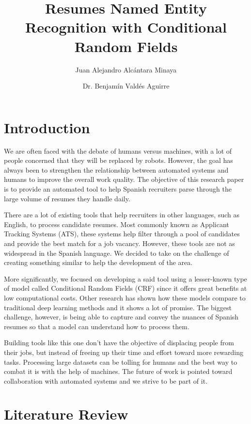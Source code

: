 \documentclass[a4paper, conference]{ieeeconf}
\title{
  \LARGE \bf Resumes Named Entity Recognition with Conditional Random Fields
}
\author{%
  Juan Alejandro Alcántara Minaya\\ \email{A01703947@exatec.tec.mx}
  \and
  Dr. Benjamín Valdés Aguirre\\ \email{bvaldes@tec.mx}
}
\begin{document}
  \maketitle

  \tableofcontents

  \section{Introduction}
  We are often faced with the debate of humans versus machines, with a lot of
  people concerned that they will be replaced by robots. However, the goal has
  always been to strengthen the relationship between automated systems and
  humans to improve the overall work quality. The objective of this research
  paper is to provide an automated tool to help Spanish recruiters parse
  through the large volume of resumes they handle daily.

  There are a lot of existing tools that help recruiters in other languages,
  such as English, to process candidate resumes. Most commonly known as
  Applicant Tracking Systems (ATS), these systems help filter through a pool of
  candidates and provide the best match for a job vacancy. However, these tools
  are not as widespread in the Spanish language. We decided to take on the
  challenge of creating something similar to help the development of
  the area.

  More significantly, we focused on developing a said tool using a lesser-known
  type of model called Conditional Random Fields (CRF) since it offers great
  benefits at low computational costs. Other research has shown how these
  models compare to traditional deep learning methods and it shows a lot of
  promise. The biggest challenge, however, is being able to capture and convey
  the nuances of Spanish resumes so that a model can understand how to process
  them.

  Building tools like this one don't have the objective of displacing people
  from their jobs, but instead of freeing up their time and effort toward more
  rewarding tasks. Processing large datasets can be tolling for humans and the
  best way to combat it is with the help of machines. The future of work is
  pointed toward collaboration with automated systems and we strive to be part
  of it.

  \section{Literature Review}
\end{document}
